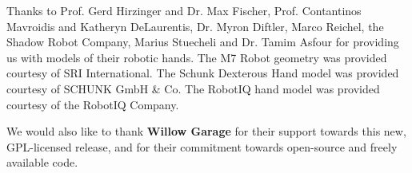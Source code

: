 Thanks to Prof. Gerd Hirzinger and Dr. Max Fischer, Prof. Contantinos
Mavroidis and Katheryn DeLaurentis, Dr. Myron Diftler, Marco Reichel,
the Shadow Robot Company, Marius Stuecheli and Dr. Tamim Asfour for
providing us with models of their robotic hands. The M7 Robot geometry
was provided courtesy of SRI International. The Schunk Dexterous Hand
model was provided courtesy of SCHUNK GmbH & Co. The RobotIQ hand
model was provided courtesy of the RobotIQ Company.

We would also like to thank \textbf{Willow Garage} for their support
towards this new, GPL-licensed release, and for their commitment
towards open-source and freely available code.
